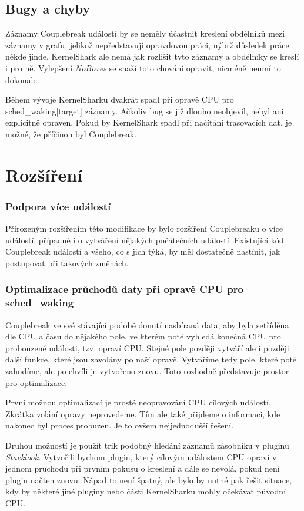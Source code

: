 \subsection{Bugy a chyby}

Záznamy Couplebreak událostí by se neměly účastnit kreslení obdélníků mezi záznamy v grafu, jelikož nepředstavují opravdovou práci, nýbrž důsledek práce někde jinde. KernelShark ale nemá jak rozlišit tyto záznamy a obdélníky se kreslí i pro ně. Vylepšení \emph{NoBoxes} se snaží toto chování opravit, nicméně neumí to dokonale.

Během vývoje KernelSharku dvakrát spadl při opravě CPU pro sched\_waking[target] záznamy. Ačkoliv bug se již dlouho neobjevil, nebyl ani explicitně opraven. Pokud by KernelShark spadl při načítání trasovacích dat, je možné, že příčinou byl Couplebreak.

\section{Rozšíření}

\subsubsection*{Podpora více událostí}
Přirozeným rozšířením této modifikace by bylo rozšíření Couplebreaku o více událostí, případně i o vytváření nějakých počátečních událostí. Existující kód Couplebreak událostí a všeho, co s jich týká, by měl dostatečně nastínit, jak postupovat při takových změnách.

\subsubsection*{Optimalizace průchodů daty při opravě CPU pro sched\_waking}
Couplebreak ve své stávající podobě donutí nasbíraná data, aby byla setříděna dle CPU a času do nějakého pole, ve kterém poté vyhledá konečná CPU pro probouzené události, tzv. opraví CPU. Stejné pole později vytváří ale i později další funkce, které jsou zavolány po naší opravě. Vytváříme tedy pole, které poté zahodíme, ale po chvíli je vytvořeno znovu. Toto rozhodně představuje prostor pro optimalizace.

První možnou optimalizací je prosté neopravování CPU cílových událostí. Zkrátka volání opravy neprovedeme. Tím ale také přijdeme o informaci, kde nakonec byl proces probuzen. Je to ovšem nejjednodušší řešení.

Druhou možností je použít trik podobný hledání záznamů zásobníku v pluginu \emph{Stacklook}. Vytvořili bychom plugin, který cílovým událostem CPU opraví v jednom průchodu při prvním pokusu o kreslení a dále se nevolá, pokud není plugin načten znovu. Nápad to není špatný, ale bylo by nutné pak řešit situace, kdy by některé jiné pluginy nebo části KernelSharku mohly očekávat původní CPU.

